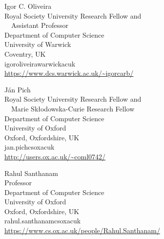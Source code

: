 \documentclass{toc}
\begin{document}
%
%
%
%
%
\begin{tocauthors}
\begin{tocinfo}[oliveira]
 Igor C. Oliveira\\
 Royal Society University Research Fellow and\\
 \ \ Assistant Professor\\
 Department of Computer Science\\
 University of Warwick\\
 Coventry, UK\\
 igor\tocdot{}oliveira\tocat{}warwick\tocdot{}ac\tocdot{}uk \\   %
 \url{https://www.dcs.warwick.ac.uk/~igorcarb/}      %
\end{tocinfo}
\begin{tocinfo}[pich]
 J\'an Pich\\
 Royal Society University Research Fellow and \\
 \ \ Marie Sk\l{}odowska-Curie Research Fellow\\
 Department of Computer Science\\
 University of Oxford\\
 Oxford, Oxfordshire, UK\\
 jan.pich\tocat{}cs\tocdot{}ox\tocdot{}ac\tocdot{}uk \\   %
 \url{http://users.ox.ac.uk/~coml0742/}      %
\end{tocinfo}
\begin{tocinfo}[santhanam]
  Rahul Santhanam\\
  Professor\\
 Department of Computer Science\\
 University of Oxford\\
 Oxford, Oxfordshire, UK\\
 rahul.santhanam\tocat{}cs\tocdot{}ox\tocdot{}ac\tocdot{}uk \\   %
 \url{https://www.cs.ox.ac.uk/people/Rahul.Santhanam/}      %
\end{tocinfo}
\end{tocauthors}
\end{document}
